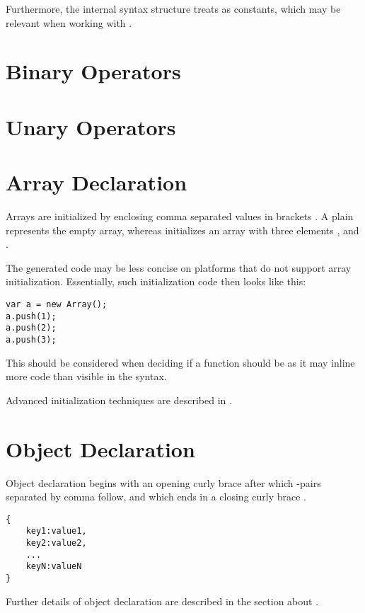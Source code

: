 \documentclass{haxe}
\begin{document}
Furthermore, the internal syntax structure treats  as constants, which may be relevant when working with .


\section{Binary Operators}
\label{expression-binops}

\section{Unary Operators}
\label{expression-unops}

\section{Array Declaration}
\label{expression-array-declaration}

Arrays are initialized by enclosing comma \expr{,} separated values in brackets \expr{[]}. A plain \expr{[]} represents the empty array, whereas \expr{[1, 2, 3]} initializes an array with three elements ,  and .

The generated code may be less concise on platforms that do not support array initialization. Essentially, such initialization code then looks like this:

\begin{lstlisting}
var a = new Array();
a.push(1);
a.push(2);
a.push(3);
\end{lstlisting}
This should be considered when deciding if a function should be  as it may inline more code than visible in the syntax.

Advanced initialization techniques are described in .


\section{Object Declaration}
\label{expression-object-declaration}

Object declaration begins with an opening curly brace \expr{\{} after which -pairs separated by comma \expr{,} follow, and which ends in a closing curly brace \expr{\}}.

\begin{lstlisting}
{
	key1:value1,
	key2:value2,
	...
	keyN:valueN
}
\end{lstlisting}
Further details of object declaration are described in the section about .
\end{document}
